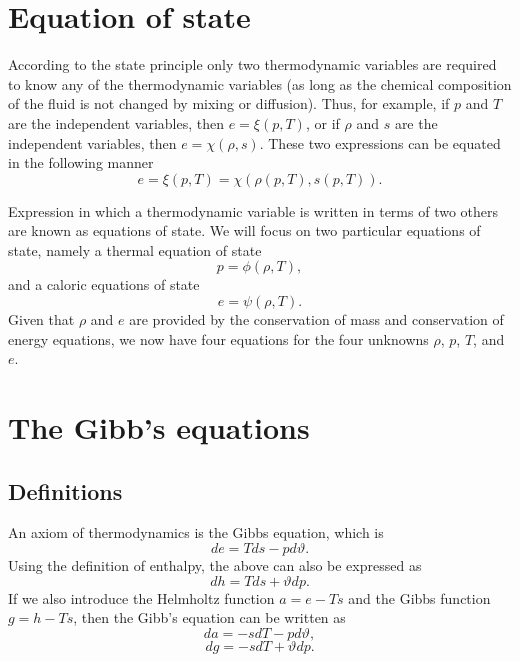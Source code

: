 \documentclass[oneside,a4paper,11pt]{report}
\begin{document}
\section{Equation of state}
\label{sec:eos}
According to the state principle only two thermodynamic variables are required to know any of the thermodynamic variables (as long as the chemical composition of the fluid is not changed by mixing or diffusion). Thus, for example, if $p$ and $T$ are the independent variables, then $e = \xi(p,T)$, or if $\rho$ and $s$ are the independent variables, then $e = \chi(\rho,s)$. These two expressions can be equated in the following manner
\begin{equation}
\label{eq:state_principle}
    e = \xi(p,T) = \chi(\rho(p,T), s(p,T)).
\end{equation}

Expression in which a thermodynamic variable is written in terms of two others are known as equations of state. We will focus on two particular equations of state, namely a thermal equation of state
\begin{equation}
\label{eq:thermal_eos}
    p = \phi(\rho,T),
\end{equation}
and a caloric equations of state 
\begin{equation}
\label{eq:caloric_eos}
    e =\psi(\rho,T).
\end{equation}
Given that $\rho$ and $e$ are provided by the conservation of mass and conservation of energy equations, we now have four equations for the four unknowns $\rho$, $p$, $T$, and $e$.

\section{The Gibb's equations}
\subsection{Definitions}
An axiom of thermodynamics is the Gibbs equation, which is
\begin{equation}
\label{eq:gibbs_form_1}
    de = T ds - pd\vartheta.
\end{equation}
Using the definition of enthalpy, the above can also be expressed as
\begin{equation}
\label{eq:gibbs_form_2}
    dh = T ds + \vartheta dp.
\end{equation}
If we also introduce the Helmholtz function $a=e - Ts$ and the Gibbs function $g=h - Ts$, then the Gibb's equation can be written as
\begin{equation}
    \label{eq:gibbs_form_3}
    da = -s dT - p d\vartheta,
\end{equation}
\begin{equation}
    \label{eq:gibbs_form_4}
    dg = -s dT + \vartheta dp.
\end{equation}
\end{document}
